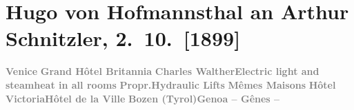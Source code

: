 

         
         \renewcommand{\erwaehntePersonen}{Personen: Richard Beer-Hofmann, Otto Brahm}
         \renewcommand{\erwaehnteOrte}{Orte: Bad Ischl, Bozen, Genua, Grand Hotel Britannia, Hotel Victoria, Hotel de la Ville, Tirol, Vahrn, Venedig, Wien}
         \renewcommand{\erwaehnteWerke}{Werke: Das Bergwerk zu Falun, Der Graf von Charolais. Ein Trauerspiel}
               \section[Hugo von Hofmannsthal an Arthur Schnitzler, 2. 10. {[}1899{]}]{ Hugo von Hofmannsthal an Arthur Schnitzler, 2. 10. {[}1899{]}}\nopagebreak{}\rehead{ }\begin{ledgroupsized}[t]{13cm}\normalsize\beginnumbering \toendnotes[C]{\smallbreak\pagebreak[2]} 
\toendnotes[C]{\smallbreak}\pstart
           \noindent{}\raggedleft{}{\pb}\textcolor{gray}{\textbf{Venice}}\pend
           \pstart
           \noindent{}\centering{}\textcolor{gray}{\textbf{Grand Hôtel
                     Britannia}}\pend
           \pstart
           \noindent{}\textcolor{gray}{\textbf{Charles Walther}}\hfill \textcolor{gray}{\textbf{Electric light and steamheat in all rooms}}\pend
           \pstart
           \textcolor{gray}{\textbf{Propr.}}\hfill \textcolor{gray}{\textbf{Hydraulic Lifts}}\pend
           \pstart
           \centering{}\textcolor{gray}{\textbf{Mêmes Maisons}}\pend
           \pstart
           \noindent{}\textcolor{gray}{\textbf{Hôtel
                        Victoria}}\hfill \textcolor{gray}{\textbf{Hôtel de la Ville}}\pend
           \pstart
           \textcolor{gray}{\textbf{Bozen (Tyrol)}}\hfill \textcolor{gray}{\textbf{Genoa – Gênes –
}}
\end{ledgroupsized}
